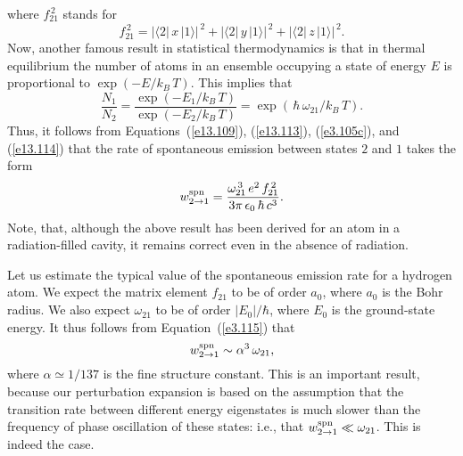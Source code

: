 where $f^{\,2}_{21}$ stands for
\begin{equation}\label{e3.106c}
f^{\,2}_{21} = |\langle 2|\,x\,|1\rangle|^{\,2}+|\langle 2|\,y\,|1\rangle|^{\,2}+ |\langle 2|\,z\,|1\rangle|^{\,2}.
\end{equation}
Now, another famous result in statistical thermodynamics is that
in thermal equilibrium the number of atoms in an ensemble occupying
a state of energy $E$ is proportional to $\exp(-E/k_B\,T)$. This implies
that
\begin{equation}\label{e13.114}
\frac{N_1}{N_2} = \frac{\exp(-E_1/k_B\,T)}{\exp(-E_2/k_B\,T)}
= \exp(\,\hbar\, \omega_{21}/k_B\,T).
\end{equation}
Thus, it follows from Equations~(\ref{e13.109}), (\ref{e13.113}), (\ref{e3.105c}), and (\ref{e13.114}) that the rate of spontaneous emission between states
$2$ and $1$ takes the form
\begin{equation}\label{e3.115}
w_{2\rightarrow 1}^{\rm spn} = \frac{\omega_{21}^{\,3}\,e^2\,f_{21}^{\,2}}{3\pi\,\epsilon_0\,\hbar\,c^3}.
\end{equation}
Note,  that, although the above result has been derived for
an atom in a radiation-filled cavity, it remains correct even in the absence
of radiation.

Let us estimate the typical value of the spontaneous emission rate for a
hydrogen atom. We expect the matrix element $f_{21}$ to be
of order $a_0$, where $a_0$ is the Bohr radius.
We also expect $\omega_{21}$ to be of order $|E_0|/\hbar$, where $E_0$
is the ground-state  energy. It thus
follows from Equation~(\ref{e3.115}) that
\begin{equation}
w_{2\rightarrow 1}^{\rm spn} \sim \alpha^3\,\omega_{21},
\end{equation}
where $\alpha \simeq 1/137$ is
the fine structure constant. This is an important result, because our perturbation
expansion is based on the assumption that the transition rate between different energy
eigenstates is much slower than the frequency of phase oscillation of these states: {\rm
i.e.}, that $w_{2\rightarrow 1}^{\rm spn} \ll \omega_{21}$. This is indeed the
case.

